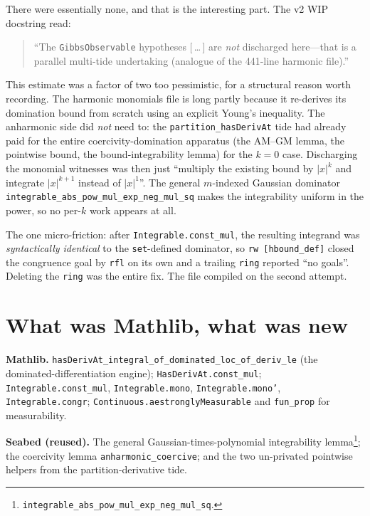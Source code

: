 \documentclass[11pt]{article}
\begin{document}
There were essentially none, and that is the interesting part. The v2
WIP docstring read:

\begin{quote}\small
``The \texttt{GibbsObservable} hypotheses [\,\ldots\,] are \emph{not}
discharged here---that is a parallel multi-tide undertaking (analogue of
the 441-line harmonic file).''
\end{quote}

This estimate was a factor of two too pessimistic, for a structural
reason worth recording. The harmonic monomials file is long partly
because it re-derives its domination bound from scratch using an
explicit Young's inequality. The anharmonic side did \emph{not} need to:
the \texttt{partition\_hasDerivAt} tide had already paid for the entire
coercivity-domination apparatus (the AM--GM lemma, the pointwise bound,
the bound-integrability lemma) for the $k{=}0$ case. Discharging the
monomial witnesses was then just ``multiply the existing bound by
$|x|^k$ and integrate $|x|^{k+1}$ instead of $|x|^1$''. The general
$m$-indexed Gaussian dominator \texttt{integrable\_abs\_pow\_mul\_exp\_neg\_mul\_sq}
makes the integrability uniform in the power, so no per-$k$ work
appears at all.

The one micro-friction: after \texttt{Integrable.const\_mul}, the
resulting integrand was \emph{syntactically identical} to the
\texttt{set}-defined dominator, so \texttt{rw [hbound\_def]} closed the
congruence goal by \texttt{rfl} on its own and a trailing \texttt{ring}
reported ``no goals''. Deleting the \texttt{ring} was the entire fix.
The file compiled on the second attempt.

\section{What was Mathlib, what was new}

\textbf{Mathlib.}
\texttt{hasDerivAt\_integral\_of\_dominated\_loc\_of\_deriv\_le} (the
dominated-differentiation engine);
\texttt{HasDerivAt.const\_mul};
\texttt{Integrable.const\_mul}, \texttt{Integrable.mono},
\texttt{Integrable.mono'}, \texttt{Integrable.congr};
\texttt{Continuous.aestronglyMeasurable} and \texttt{fun\_prop} for
measurability.

\textbf{Seabed (reused).} The general Gaussian-times-polynomial
integrability lemma\footnote{%
\texttt{integrable\_abs\_pow\_mul\_exp\_neg\_mul\_sq}.};
the coercivity lemma \texttt{anharmonic\_coercive}; and the two
un-privated pointwise helpers from the partition-derivative tide.
\end{document}
